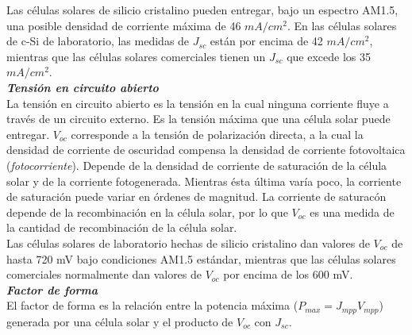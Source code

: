 \documentclass[12pt]{article}
\begin{document}
	\noindent Las células solares de silicio cristalino pueden entregar, bajo un espectro AM1.5, una posible densidad de corriente máxima de 46 $mA/cm^2$. En las células solares de c-Si de laboratorio, las medidas de $J_{sc}$ están por encima de 42 $mA/cm^2$, mientras que las células solares comerciales tienen un $J_{sc}$ que excede los 35 $mA/cm^2$. \\
	
	\noindent \textit{\textbf{Tensión en circuito abierto}} \\
	
	\noindent La tensión en circuito abierto es la tensión en la cual ninguna corriente fluye a través de un circuito externo. Es la tensión máxima que una célula solar puede entregar. $V_{oc}$ corresponde a la tensión de polarización directa, a la cual la densidad de corriente de oscuridad compensa la densidad de corriente fotovoltaica (\textit{fotocorriente}). Depende de la densidad de corriente de saturación de la célula solar y de la corriente fotogenerada. Mientras ésta última varía poco, la corriente de saturación puede variar en órdenes de magnitud. La corriente de saturacón depende de la recombinación en la célula solar, por lo que $V_{oc}$ es una medida de la cantidad de recombinación de la célula solar.\\
	
	\noindent Las células solares de laboratorio hechas de silicio cristalino dan valores de $V_{oc}$ de hasta 720 mV bajo condiciones AM1.5 estándar, mientras que las células solares comerciales normalmente dan valores de $V_{oc}$ por encima de los 600 mV. \\
	
	\noindent \textit{\textbf{Factor de forma}} \\
	
	\noindent El factor de forma es la relación entre la potencia máxima ($P_{max} = J_{mpp} V_{mpp}$) generada por una célula solar y el producto de $V_{oc}$ con $J_{sc}$. \\
	
\end{document}
